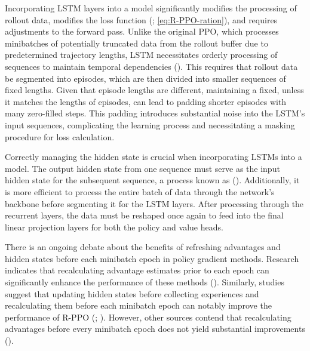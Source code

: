             \noindent Incorporating LSTM layers into a model significantly modifies the processing of rollout data, modifies the loss function (\textcolor{deepblue}{\cite{pleines2022generalization}; \autoref{eq:R-PPO-ration}}), and requires adjustments to the forward pass. Unlike the original PPO, which processes minibatches of potentially truncated data from the rollout buffer due to predetermined trajectory lengths, LSTM necessitates orderly processing of sequences to maintain temporal dependencies (\textcolor{deepblue}{\cite{shengyi2022the37implementation}}). This requires that rollout data be segmented into episodes, which are then divided into smaller sequences of fixed lengths. Given that episode lengths are different, maintaining a fixed, unless it matches the lengths of episodes, can lead to padding shorter episodes with many zero-filled steps. This padding introduces substantial noise into the LSTM's input sequences, complicating the learning process and necessitating a masking procedure for loss calculation.
            
            \bigskip
            
            \noindent Correctly managing the hidden state is crucial when incorporating LSTMs into a model. The output hidden state from one sequence must serve as the input hidden state for the subsequent sequence, a process known as  (\textcolor{deepblue}{\cite{tallec2017unbiasing}}). Additionally, it is more efficient to process the entire batch of data through the network's backbone before segmenting it for the LSTM layers. After processing through the recurrent layers, the data must be reshaped once again to feed into the final linear projection layers for both the policy and value heads.
            
            \bigskip
            
            \noindent There is an ongoing debate about the benefits of refreshing advantages and hidden states before each minibatch epoch in policy gradient methods. Research indicates that recalculating advantage estimates prior to each epoch can significantly enhance the performance of these methods (\textcolor{deepblue}{\cite{andrychowicz2021what}}). Similarly, studies suggest that updating hidden states before collecting experiences and recalculating them before each minibatch epoch can notably improve the performance of R-PPO (\textcolor{deepblue}{\cite{kapturowski2018recurrent}; \cite{GuptaRecurrentPPO}}). However, other sources contend that recalculating advantages before every minibatch epoch does not yield substantial improvements (\textcolor{deepblue}{\cite{pleines2022generalization}}).

